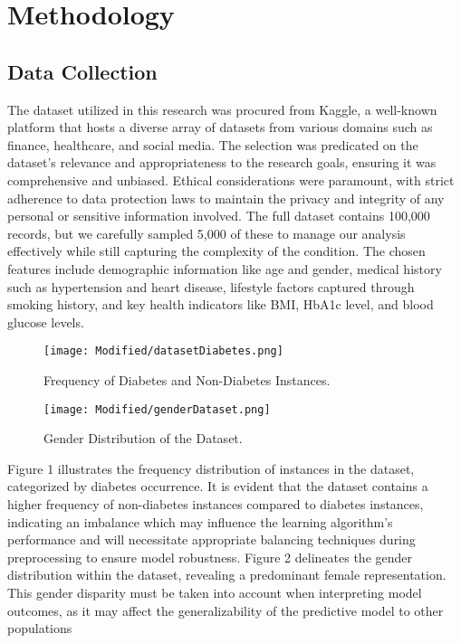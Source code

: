 \documentclass[a4paper,num-refs,gigabyte]{oup-contemporary}
\begin{document}
\section{Methodology}

\subsection{Data Collection}
The dataset utilized in this research was procured from Kaggle, a well-known platform that hosts a diverse array of datasets from various domains such as finance, healthcare, and social media. The selection was predicated on the dataset's relevance and appropriateness to the research goals, ensuring it was comprehensive and unbiased. Ethical considerations were paramount, with strict adherence to data protection laws to maintain the privacy and integrity of any personal or sensitive information involved.
The full dataset contains  100,000 records, but we carefully sampled 5,000 of these to manage our analysis effectively while still capturing the complexity of the condition. The chosen features include demographic information like age and gender, medical history such as hypertension and heart disease, lifestyle factors captured through smoking history, and key health indicators like BMI, HbA1c level, and blood glucose levels. 



\begin{figure*}[ht]
    \begin{minipage}[b]{0.5\linewidth}
        \centering
        \texttt{[image: Modified/datasetDiabetes.png]}
        \captionsetup{justification=centering, singlelinecheck=off} %
        \caption{Frequency of Diabetes and Non-Diabetes Instances.}
        \label{fig:ConfusionMatrix}
    \end{minipage}
    \begin{minipage}[b]{0.5\linewidth}
        \centering
        \texttt{[image: Modified/genderDataset.png]}
        \captionsetup{justification=centering, singlelinecheck=off} %
        \caption{Gender Distribution of the Dataset.}
        \label{fig:Gender}
    \end{minipage}
\end{figure*}
Figure 1 illustrates the frequency distribution of instances in the dataset, categorized by diabetes occurrence. It is evident that the dataset contains a higher frequency of non-diabetes instances compared to diabetes instances, indicating an imbalance which may influence the learning algorithm's performance and will necessitate appropriate balancing techniques during preprocessing to ensure model robustness.
Figure 2 delineates the gender distribution within the dataset, revealing a predominant female representation. This gender disparity must be taken into account when interpreting model outcomes, as it may affect the generalizability of the predictive model to other populations
\end{document}

